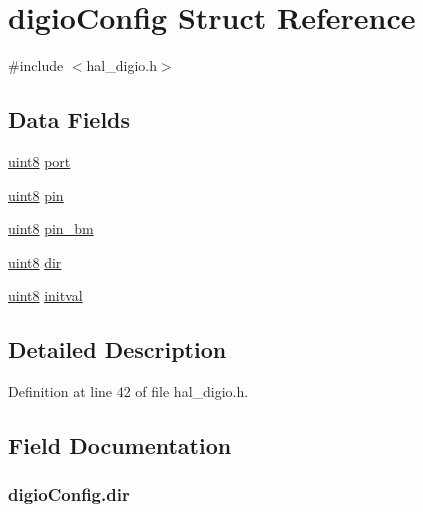 \hypertarget{structdigio_config}{
\section{digioConfig Struct Reference}
\label{structdigio_config}
}


{\ttfamily \#include $<$hal\_\-digio.h$>$}

\subsection*{Data Fields}
\begin{DoxyCompactItemize}
\item 
\hyperlink{hal__types_8h_adde6aaee8457bee49c2a92621fe22b79}{uint8} \hyperlink{structdigio_config_a54688988bc7641c2849746e8cdf87702}{port}
\item 
\hyperlink{hal__types_8h_adde6aaee8457bee49c2a92621fe22b79}{uint8} \hyperlink{structdigio_config_afaad59b890aa416753468661d6dc5336}{pin}
\item 
\hyperlink{hal__types_8h_adde6aaee8457bee49c2a92621fe22b79}{uint8} \hyperlink{structdigio_config_a2c5420292518ad9ac5fb7d3ca93552a1}{pin\_\-bm}
\item 
\hyperlink{hal__types_8h_adde6aaee8457bee49c2a92621fe22b79}{uint8} \hyperlink{structdigio_config_a2dc452302faf5baf52dc9559fa301b27}{dir}
\item 
\hyperlink{hal__types_8h_adde6aaee8457bee49c2a92621fe22b79}{uint8} \hyperlink{structdigio_config_aef87584f20450c75a803358d7370ffbc}{initval}
\end{DoxyCompactItemize}


\subsection{Detailed Description}


Definition at line 42 of file hal\_\-digio.h.



\subsection{Field Documentation}
\hypertarget{structdigio_config_a2dc452302faf5baf52dc9559fa301b27}{
\subsubsection[{dir}]{ {\bf digioConfig.dir}}}
\label{structdigio_config_a2dc452302faf5baf52dc9559fa301b27}


